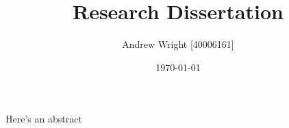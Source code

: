 \documentclass[12pt]{article}
\title{Research Dissertation}
\author{Andrew Wright [40006161]}
\date{\today}
\begin{document}
\maketitle

\abstract{}
Here's an abstract









\end{document}
